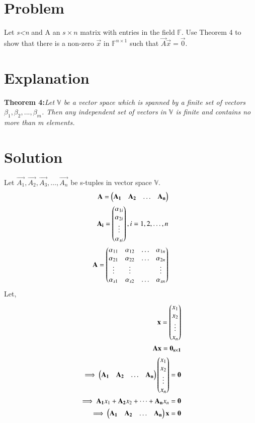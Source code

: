 \documentclass[journal,12pt,twocolumn]{IEEEtran}
\begin{document}
\section{Problem}
Let \textit{s\textless n} and A an $s\times n$ matrix with entries in the field $\mathbb{F}$. Use Theorem 4 to show that there is a non-zero $\vec{x}$ in $\mathbb{F}^{n\times 1}$ such that $\vec{A}\vec{x}=\vec{0}$. 
\section{Explanation}
\textbf{Theorem 4:}\textit{Let $\mathbb{V}$ be a vector space which is spanned by a finite set of vectors $\beta_1,\beta_2,...,\beta_m$. Then any independent set of vectors in $\mathbb{V}$ is finite and contains no more than m elements.}
\section{Solution}
Let $\vec{A_1},\vec{A_2},\vec{A_3},\dots,\vec{A_n}$ be s-tuples in vector space $\mathbb{V}$.
\begin{align}
    \mathbf{A}=\begin{pmatrix}\mathbf{A_1}&\mathbf{A_2}&\dots&\mathbf{A_n}\end{pmatrix}\\
    \mathbf{A_i}=\begin{pmatrix}\alpha_{1i}\\\alpha_{2i}\\\vdots\\\alpha_{si}\end{pmatrix}, i=1,2,\dots,n\\
    \mathbf{A}=\begin{pmatrix}\alpha_{11} & \alpha_{12} & \dots&\alpha_{1n} \\ \alpha_{21} & \alpha_{22} & \dots&\alpha_{2n}\\\vdots &\vdots& &\vdots\\\alpha_{s1} & \alpha_{s2} & \dots&\alpha_{sn}\end{pmatrix} \label{eqmatrixA}
\end{align}
Let,
\begin{align}
\mathbf{x}=\begin{pmatrix}x_1\\x_2\\\vdots\\x_n\end{pmatrix}&\\
\mathbf{A}\mathbf{x}=\mathbf{0_{s\times1}}&\\
\implies \begin{pmatrix}\mathbf{A_1}&\mathbf{A_2}&\dots&\mathbf{A_n}\end{pmatrix}\begin{pmatrix}x_1\\x_2\\\vdots\\x_n\end{pmatrix}=\mathbf{0}&\\
\implies \mathbf{A_1}x_1+\mathbf{A_2}x_2+\dots+\mathbf{A_n}x_n=\mathbf{0} \label{eqhomogeneous}\\
\implies \begin{pmatrix}\mathbf{A_1}&\mathbf{A_2}&\dots&\mathbf{A_n}\end{pmatrix}\mathbf{x}=\mathbf{0}
\end{align}
\end{document}
